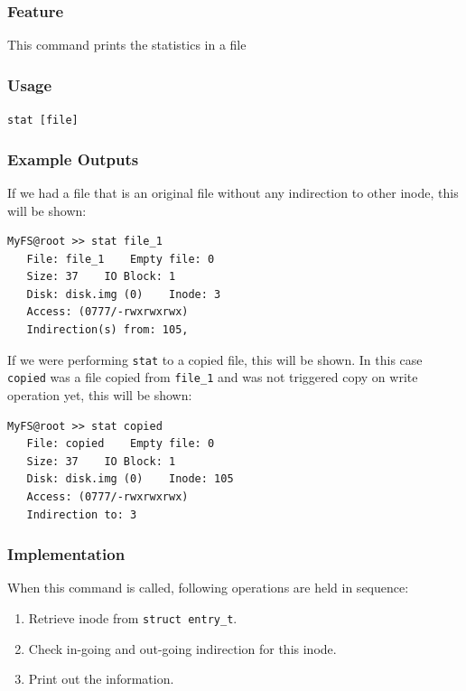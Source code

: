 \documentclass{homework}
\begin{document}
\subsubsection{Feature}
This command prints the statistics in a file
\subsubsection{Usage}
\begin{center}
\texttt{stat [file]}
\end{center}

\subsubsection{Example Outputs}
If we had a file that is an original file without any indirection to other inode, this will be shown:
\\
\begin{center}
\begin{code}
\begin{verbatim}
MyFS@root >> stat file_1
   File: file_1    Empty file: 0
   Size: 37    IO Block: 1
   Disk: disk.img (0)    Inode: 3
   Access: (0777/-rwxrwxrwx)
   Indirection(s) from: 105,
\end{verbatim}
\end{code}
\end{center}

If we were performing \texttt{stat} to a copied file, this will be shown. In this case \texttt{copied} was a file copied from \texttt{file_1} and was not triggered copy on write operation 
 yet, this will be shown:
\\
\begin{center}
\begin{code}
\begin{verbatim}
MyFS@root >> stat copied
   File: copied    Empty file: 0
   Size: 37    IO Block: 1
   Disk: disk.img (0)    Inode: 105
   Access: (0777/-rwxrwxrwx)
   Indirection to: 3
\end{verbatim}
\end{code}
\end{center}


\subsubsection{Implementation}
When this command is called, following operations are held in sequence:
\begin{enumerate}
    \item Retrieve inode from \texttt{struct entry_t}.
    \item Check in-going and out-going indirection for this inode.
    \item Print out the information.
\end{enumerate}
\end{document}
